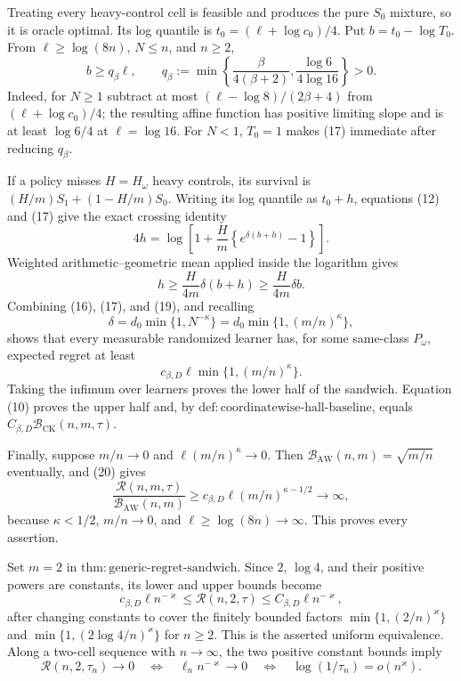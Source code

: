 Treating every heavy-control cell is feasible and produces the pure \(S_0\) mixture, so it is oracle optimal.  Its log quantile is \(t_0=(\ell+\log c_0)/4\).  Put \(b=t_0-\log T_0\).  From \(\ell\geq\log(8n)\), \(N\leq n\), and \(n\geq2\),
\[
b\geq q_\beta\ell,
\qquad
q_\beta:=\min\left\{\frac\beta{4(\beta+2)},\frac{\log6}{4\log16}\right\}>0. \tag{17}
\]
Indeed, for \(N\geq1\) subtract at most \((\ell-\log8)/(2\beta+4)\) from \((\ell+\log c_0)/4\); the resulting affine function has positive limiting slope and is at least \(\log6/4\) at \(\ell=\log16\).  For \(N<1\), \(T_0=1\) makes (17) immediate after reducing \(q_\beta\).

If a policy misses \(H=H_\omega\) heavy controls, its survival is \((H/m)S_1+(1-H/m)S_0\).  Writing its log quantile as \(t_0+h\), equations (12) and (17) give the exact crossing identity
\[
4h=\log\left[1+\frac Hm\left\{e^{\delta(b+h)}-1\right\}\right].          \tag{18}
\]
Weighted arithmetic--geometric mean applied inside the logarithm gives
\[
h\geq\frac{H}{4m}\delta(b+h)\geq\frac{H}{4m}\delta b.                  \tag{19}
\]
Combining (16), (17), and (19), and recalling
\[
\delta=d_0\min\{1,N^{-\kappa}\}
=d_0\min\{1,(m/n)^\kappa\},
\]
shows that every measurable randomized learner has, for some same-class \(P_\omega\), expected regret at least
\[
c_{\beta,D}\ell\min\{1,(m/n)^\kappa\}.                                 \tag{20}
\]
Taking the infimum over learners proves the lower half of the sandwich.  Equation (10) proves the upper half and, by \(\mathrm{def{:}coordinatewise\text{-}hall\text{-}baseline}\), equals \(C_{\beta,D}\mathcal B_{\mathrm{CK}}(n,m,\tau)\).

Finally, suppose \(m/n\to0\) and \(\ell(m/n)^\kappa\to0\).  Then \(\mathcal B_{\mathrm{AW}}(n,m)=\sqrt{m/n}\) eventually, and (20) gives
\[
\frac{\mathcal R(n,m,\tau)}{\mathcal B_{\mathrm{AW}}(n,m)}
\geq c_{\beta,D}\ell(m/n)^{\kappa-1/2}\longrightarrow\infty,
\]
because \(\kappa<1/2\), \(m/n\to0\), and \(\ell\geq\log(8n)\to\infty\).  This proves every assertion.

Set \(m=2\) in \(\mathrm{thm{:}generic\text{-}regret\text{-}sandwich}\).  Since \(2\), \(\log4\), and their positive powers are constants, its lower and upper bounds become
\[
c_{\beta,D}\ell n^{-\varkappa}
\leq\mathcal R(n,2,\tau)
\leq C_{\beta,D}\ell n^{-\varkappa},
\]
after changing constants to cover the finitely bounded factors \(\min\{1,(2/n)^\varkappa\}\) and \(\min\{1,(2\log4/n)^\varkappa\}\) for \(n\geq2\).  This is the asserted uniform equivalence.  Along a two-cell sequence with \(n\to\infty\), the two positive constant bounds imply
\[
\mathcal R(n,2,\tau_n)\to0
\quad\Longleftrightarrow\quad
\ell_n n^{-\varkappa}\to0
\quad\Longleftrightarrow\quad
\log(1/\tau_n)=o(n^\varkappa).
\]

